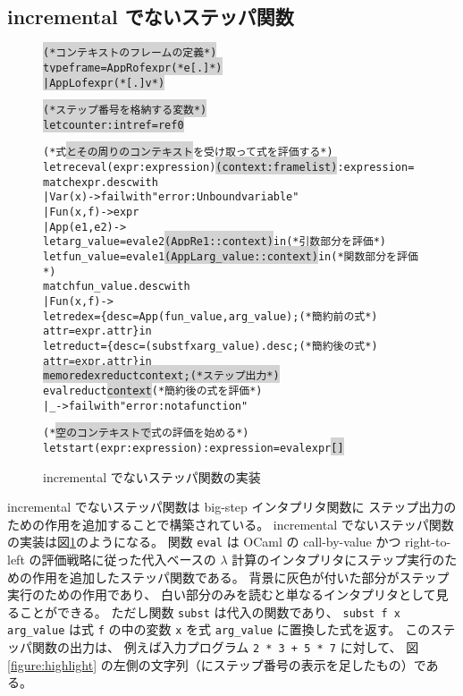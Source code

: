 \subsection{incremental でないステッパ関数}

\begin{figure}[t]
\begin{spacing}{0.8}
  \begin{alltt}
\colorbox{lightgray}{(* コンテキストのフレームの定義 *)}
\colorbox{lightgray}{type frame = AppR of expr  (* e [.] *)}
\colorbox{lightgray}{           | AppL of expr  (* [.] v *)}

\colorbox{lightgray}{(* ステップ番号を格納する変数 *)}
\colorbox{lightgray}{let counter : int ref = ref 0}

(* 式\colorbox{lightgray}{とその周りのコンテキスト}を受け取って式を評価する *)
let rec eval (expr : expression) \colorbox{lightgray}{(context : frame list)} : expression =
  match expr.desc with
    | Var (x) -> failwith "error: Unbound variable"
    | Fun (x, f) -> expr
    | App (e1, e2) ->
      let arg\_value = eval e2 \colorbox{lightgray}{(AppR e1 :: context)} in       (* 引数部分を評価 *)
      let fun\_value = eval e1 \colorbox{lightgray}{(AppL arg\_value :: context)} in(* 関数部分を評価 *)
      match fun\_value.desc with
        | Fun (x, f) ->
          let redex = \{desc = App (fun\_value, arg\_value);       (* 簡約前の式 *)
                      attr = expr.attr\} in
          let reduct = \{desc = (subst f x arg\_value).desc ;     (* 簡約後の式 *)
                        attr = expr.attr\} in
          \colorbox{lightgray}{memo redex reduct context;                          (* ステップ出力 *)}
          eval reduct \colorbox{lightgray}{context}                             (* 簡約後の式を評価 *)
        | \_ -> failwith "error: not a function"

(* \colorbox{lightgray}{空のコンテキストで}式の評価を始める *)
let start (expr : expression) : expression = eval expr \colorbox{lightgray}{[]}
\end{alltt}
\end{spacing}
\caption{incremental でないステッパ関数の実装}
\label{figure:old-stepper}
\end{figure}

incremental でないステッパ関数は big-step インタプリタ関数に
ステップ出力のための作用を追加することで構築されている。
incremental でないステッパ関数の実装は図\ref{figure:old-stepper}のようになる。
関数 \texttt{eval} は OCaml の call-by-value かつ right-to-left
の評価戦略に従った代入ベースの $\lambda$
計算のインタプリタにステップ実行のための作用を追加したステッパ関数である。
背景に灰色が付いた部分がステップ実行のための作用であり、
白い部分のみを読むと単なるインタプリタとして見ることができる。
ただし関数 \texttt{subst} は代入の関数であり、
\texttt{subst f x arg\_value} は式 \texttt{f} の中の変数
\texttt{x} を式 \texttt{arg\_value} に置換した式を返す。
このステッパ関数の出力は、
例えば入力プログラム \texttt{2 * 3 + 5 * 7} に対して、
図 \ref{figure:highlight} の左側の文字列（にステップ番号の表示を足したもの）である。

